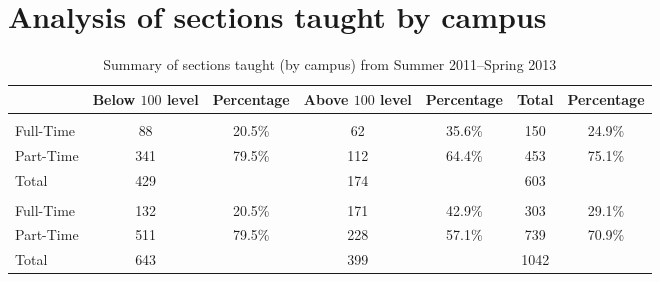 \chapter{Analysis of sections taught by campus}\label{app:sec:analysisPTFT}



\begin{table}[!htb]
	\centering
	\caption{Summary of sections taught (by campus) from Summer 2011--Spring 2013}
	\label{app:tab:analysisPTFT}
	\begin{tabular}{l*{6}{c}}
		\toprule
		                & Below $100$ level & Percentage & Above $100$ level & Percentage & Total & Percentage \\
		\midrule
		\llap{Cascade}  &                   &            &                   &            &       &            \\
		Full-Time       & 88                & 20.5\%     & 62                & 35.6\%     & 150   & 24.9\%     \\
		Part-Time       & 341               & 79.5\%     & 112               & 64.4\%     & 453   & 75.1\%     \\
		\cmidrule{2-7}
		Total           & 429               &            & 174               &            & 603   &            \\
		\bottomrule
		\llap{Sylvania} &                   &            &                   &            &       &            \\
		Full-Time       & 132               & 20.5\%     & 171               & 42.9\%     & 303   & 29.1\%     \\
		Part-Time       & 511               & 79.5\%     & 228               & 57.1\%     & 739   & 70.9\%     \\
		\cmidrule{2-7}
		Total           & 643               &            & 399               &            & 1042  &            \\
		\bottomrule
	\end{tabular}
\end{table}

